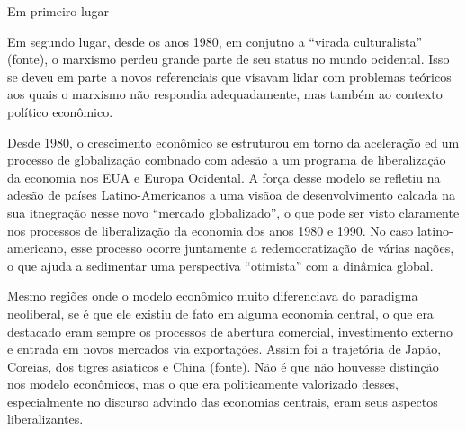Em primeiro lugar

Em segundo lugar, desde os anos 1980, em conjutno a ``virada culturalista'' (fonte), o marxismo perdeu grande parte de seu status no mundo ocidental. Isso se deveu em parte a novos referenciais que visavam lidar com problemas teóricos aos quais o marxismo não respondia adequadamente, mas também ao contexto político econômico. 

Desde 1980, o crescimento econômico se estruturou em torno  da aceleração ed um processo de globalização combnado com adesão a um programa de liberalização da economia nos EUA e Europa Ocidental. A força desse modelo se refletiu na adesão de países Latino-Americanos a uma visãoa de desenvolvimento calcada na sua itnegração nesse novo ``mercado globalizado'', o que pode ser visto claramente nos processos de liberalização da economia dos anos 1980 e 1990. No caso latino-americano, esse processo ocorre juntamente a redemocratização de várias nações, o que ajuda a sedimentar uma perspectiva ``otimista'' com a dinâmica global.

Mesmo regiões onde o modelo econômico muito diferenciava do paradigma neoliberal, se é que ele existiu de fato em alguma economia central, o que era destacado eram sempre os processos de abertura comercial, investimento externo e entrada em novos mercados via exportações. Assim foi a trajetória de Japão, Coreias, dos tigres asiaticos e China (fonte). Não é que não houvesse distinção nos modelo econômicos, mas o que era politicamente valorizado desses, especialmente no discurso advindo das economias centrais, eram seus aspectos liberalizantes.

